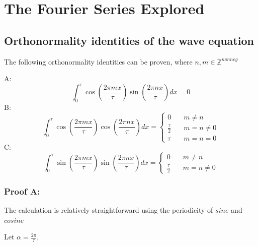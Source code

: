 \documentclass{article}
\begin{document}
\section{The Fourier Series Explored}

\subsection{Orthonormality identities of the wave equation}
The following orthonormality identities can be proven, where $n,m \in \mathbb{Z}^{nonneg}$ 

A:
\begin{equation*}
    \int_{0}^{\tau} \cos(\frac{2\pi mx}{\tau})\sin(\frac{2\pi nx}{\tau})dx=0
\end{equation*}B:
\begin{equation*}
     \int_{0}^{\tau} \cos(\frac{2\pi mx}{\tau})\cos(\frac{2\pi nx}{\tau})dx= \begin{cases}
        0 & \quad m \neq n \\
        \frac{\tau}{2} & \quad m=n \neq 0 \\
        \tau & \quad m=n=0
     \end{cases}
\end{equation*}
C:
\begin{equation*}
    \int_{0}^{\tau} \sin(\frac{2\pi mx}{\tau})\sin(\frac{2\pi nx}{\tau})dx=
    \begin{cases}
            0 & \quad m \neq n \\
            \frac{\tau}{2} & \quad m=n \neq 0 
    \end{cases}
\end{equation*}
\subsubsection{Proof A:}
The calculation is relatively straightforward using the periodicity of $sine$ and $cosine$ 

Let $\alpha = \frac{2\pi}{\tau}$, 
\end{document}
